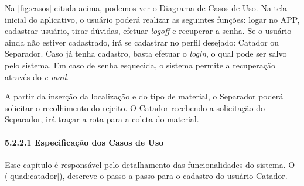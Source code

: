 
Na \autoref{fig:casos} citada acima, podemos ver o Diagrama de Casos de Uso. Na tela inicial do aplicativo, o usuário poderá realizar as seguintes funções: logar no APP, cadastrar usuário, tirar dúvidas, efetuar \textit{logoff} e recuperar a senha. Se o usuário ainda não estiver cadastrado, irá se cadastrar no perfil desejado: Catador ou Separador. Caso já tenha cadastro, basta efetuar o \textit{login}, o qual pode ser salvo pelo sistema. Em caso de senha esquecida, o sistema permite a recuperação através do \textit{e-mail}.

A partir da inserção da localização e do tipo de material, o Separador poderá solicitar o recolhimento do rejeito. O Catador recebendo a solicitação do Separador, irá traçar a rota para a coleta do material. 

\paragraph*{5.2.2.1 Especificação dos Casos de Uso}

Esse capítulo é responsável pelo detalhamento das funcionalidades do sistema. O (\autoref{quad:catador}), descreve o passo a passo para o cadastro do usuário Catador.


